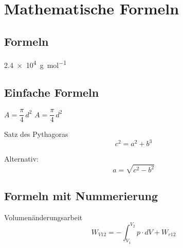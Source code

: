 \chapter{Mathematische Formeln}
    \section{Formeln}
        \SI{2,4e4}{\gram \per \mole}

    \section{Einfache Formeln}
        \begin{math}
            A = \dfrac{\pi}{4}\,d^2
        \end{math}
        \newline
        \(A = \dfrac{\pi}{4}\,d^2\)

        Satz des Pythagoras
        \begin{displaymath}
            c^2 = a^2 + b^3
        \end{displaymath}

        Alternativ:
        \[
            a = \sqrt{c^2 - b^2}
        \]

    \section{Formeln mit Nummerierung}
        Volumenänderungsarbeit
        \begin{equation}
            W_{V12} = - \int_{V_1}^{V_2} p \cdot dV + W_{r12}
        \end{equation}

